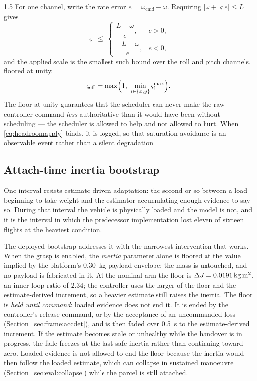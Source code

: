 \begin{spacing}{1.5}
For one channel, write the rate error $e=\omega_{\mathrm{cmd}}-\omega$. Requiring
$|\omega+\varsigma e|\le L$ gives
\begin{equation}
\varsigma \;\le\;
\begin{cases}
\dfrac{L-\omega}{e}, & e>0,\\[8pt]
\dfrac{-L-\omega}{e}, & e<0,
\end{cases}
\label{eq:headroom}
\end{equation}
and the applied scale is the smallest such bound over the roll and pitch
channels, floored at unity:
\begin{equation}
\varsigma_{\mathrm{eff}} = \max\Bigl(1,\ \min_{i\in\{x,y\}} \varsigma_i^{\max}\Bigr).
\label{eq:headroomapply}
\end{equation}
The floor at unity guarantees that the scheduler can never make the raw
controller command \emph{less} authoritative than it would have been without
scheduling --- the scheduler is allowed to help and not allowed to hurt. When
\eqref{eq:headroomapply} binds, it is logged, so that saturation avoidance is an
observable event rather than a silent degradation.

\subsection{Attach-time inertia bootstrap}\label{sec:frame:bootstrap}

One interval resists estimate-driven adaptation: the second or so between a load
beginning to take weight and the estimator accumulating enough evidence to say
so. During that interval the vehicle is physically loaded and the model is not,
and it is the interval in which the predecessor implementation lost eleven of
sixteen flights at the heaviest condition.

The deployed bootstrap addresses it with the narrowest intervention that works.
When the grasp is enabled, the \emph{inertia} parameter alone is floored at the value
implied by the platform's \SI{0.30}{\kg} payload envelope; the mass is untouched,
and no payload is fabricated in it. At the nominal arm the floor is
$\dJ=\SI{0.0191}{\kg\meter\squared}$, an inner-loop ratio of $2.34$; the
controller uses the larger of the floor and the estimate-derived increment, so a
heavier estimate still raises the inertia. The floor is \emph{held until
command}: loaded evidence does not end it. It is ended by the controller's
release command, or by the acceptance of an uncommanded loss
(Section~\ref{sec:frame:accdet}), and is then faded over \SI{0.5}{\second} to the
estimate-derived increment. If the estimate becomes stale or unhealthy while the
handover is in progress, the fade freezes at the last safe inertia rather than
continuing toward zero. Loaded evidence is not allowed to end the floor because
the inertia would then follow the loaded estimate, which can collapse in
sustained manoeuvre (Section~\ref{sec:eval:collapse}) while the parcel is still
attached.


\end{spacing}
